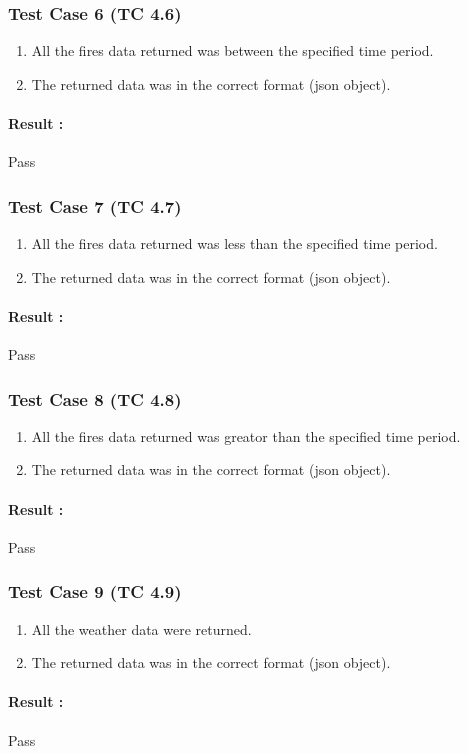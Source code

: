\subsubsection{Test Case 6 (TC 4.6)}

\begin{enumerate}
	\item All the fires data returned was between the specified time period.
	\item The returned data was in the correct format (json object).
\end{enumerate}

\paragraph{Result :} Pass

\subsubsection{Test Case 7 (TC 4.7)}

\begin{enumerate}
	\item All the fires data returned was less than the specified time period.
	\item The returned data was in the correct format (json object).
\end{enumerate}

\paragraph{Result :} Pass

\subsubsection{Test Case 8 (TC 4.8)}

\begin{enumerate}
	\item All the fires data returned was greator than the specified time period.
	\item The returned data was in the correct format (json object).
\end{enumerate}

\paragraph{Result :} Pass


\subsubsection{Test Case 9 (TC 4.9)}

\begin{enumerate}
	\item All the weather data were returned.
	\item The returned data was in the correct format (json object).
\end{enumerate}

\paragraph{Result :} Pass